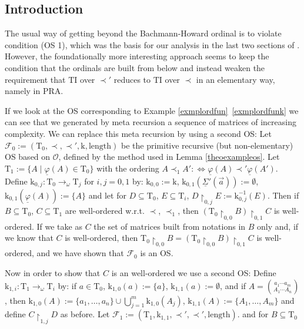 \documentclass[10pt]{article}
\def \refcom#1#2{\ref{#1}\ \ref{#1#2}}%
\def\ar{\rightarrow}
\def \Iff{\Leftrightarrow}
\def \calO{{\mathcal O}}
\def\length{\mathrm{length}}
\def\k{\mathrm{k}}
\def\phibar{{\underline{\varphi}}}
\def\T{\mathrm{T}}
\def\TI{\mathrm{TI}}
\def\Sigmabar{\underline{\Sigma}}
\def\PRA{\mathrm{PRA}}
\def\calF{\mathcal{F}}
\def \avec{{\vec a}}
\begin{document}
\subsection{Introduction}
The usual way of getting beyond the Bachmann-Howard ordinal is to 
violate condition (OS 1), which was the basis for our analysis in
the last two sections of \cite{setzvenedig}. However, 
the foundationally more interesting 
approach seems to keep the condition that the ordinals are built
from below and instead weaken the requirement that 
$\TI$ over $\prec '$ 
reduces to $\TI$ over $\prec$ in an elementary way, namely in $\PRA$.\par 
If we look at the OS corresponding to 
Example \refcom{exmplordfun}k we can see that we generated
by meta recursion a sequence of matrices of increasing complexity.
We can replace this meta recursion by using a second OS:
Let $\calF_0:=(\T_0,\prec,\prec',\k,\length)$ be the 
primitive recursive (but non-elementary) OS based on 
$\calO$, defined by the method used in Lemma \ref{theoexampleos}.
Let $\T_1:= \{ A \mid \phibar(A) \in \T_0 \}$ with the ordering 
$A \prec_1 A' :\Iff  \phibar(A) \prec' \phibar(A')$.
Define $\k_{0,j}: \T_0 \ar_\omega \T_j$ for $i,j=0,1$ by:
$\k_{0,0}:= \k$, $\k_{0,1}(\Sigmabar'(\avec)):= \emptyset$,
$\k_{0,1}(\phibar(A)):= \{ A \}$ and let
for $D \subseteq \T_0$, $E \subseteq \T_i$, $D \restriction_{0,j}E:=
\k_{0,j}^{-1}(E)$. Then if $B \subseteq \T_0$,
$C \subseteq \T_1$ are well-ordered w.r.t. $\prec$, $\prec_1$, then
$(\T_0 \restriction_{0,0} B) \restriction_{0,1} C$
is well-ordered. If we take as $C$ the
set of matrices built from notations in $B$ only and, if we know
that $C$ is well-ordered, then $\T_0 \restriction_{0,0} B = 
(\T_0 \restriction_{0,0} B) \restriction_{0,1} C$ is well-ordered, and
we have shown that $\calF_0$ is an OS.\par
Now in order to show that $C$ is an well-ordered we use a second 
OS:
Define $\k_{1,i}: \T_1  \ar_\omega \T_i$ by: 
if $a \in \T_0$, $\k_{1,0}(a) := \{ a \}$,
$\k_{1,1}(a):= \emptyset$, and
if $A = 
{\binom{a_1 \cdots a_m }{A_1 \cdots A_n}}$, then
$\k_{1,0}(A):= \{ a_1 ,\ldots, a_n \} 
\cup \bigcup_{j=1}^m \k_{1,0}(A_j)$,
$\k_{1,1} (A):= \{ A_1 ,\ldots, A_m \}$ and define 
$C\restriction_{1,j}D$ as before.
Let $\calF_1:= (\T_1,\k_{1,1},\prec ',\prec ',\length)$.
and for  $B \subseteq \T_0$ 
\end{document}

